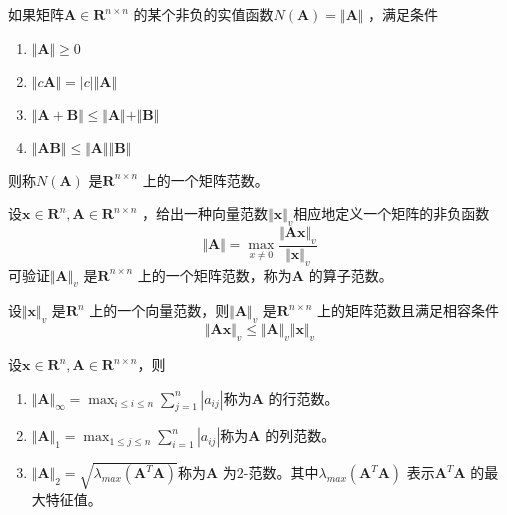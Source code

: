 \documentclass[a4paper]{article}
\begin{document}
\begin{definition}
	如果矩阵$\mathbf{A} \in \mathbf{R}^{n \times n}$ 的某个非负的实值函数$N(\mathbf{A}) = \Vert \mathbf{A} \Vert$ ，满足条件
	\begin{enumerate}
		\item $\Vert \mathbf{A} \Vert \ge 0$ 
		\item $\Vert c \mathbf{A} \Vert = |c| \Vert \mathbf{A} \Vert$ 
		\item $\Vert \mathbf{A} + \mathbf{B} \Vert \le \Vert \mathbf{A} \Vert + \Vert \mathbf{B} \Vert$
		\item $\Vert \mathbf{AB} \Vert \le \Vert \mathbf{A} \Vert \Vert \mathbf{B} \Vert$
	\end{enumerate}
	则称$N(\mathbf{A})$ 是$\mathbf{R}^{n \times n}$ 上的一个矩阵范数。
\end{definition}

\begin{definition}
	设$\mathbf{x} \in \mathbf{R}^{n}, \mathbf{A} \in \mathbf{R}^{n \times n}$ ，给出一种向量范数$\Vert \mathbf{x} \Vert_v$相应地定义一个矩阵的非负函数
	\[
		\Vert \mathbf{A} \Vert = \max_{x \neq 0} \frac{\Vert \mathbf{Ax} \Vert_v}{\Vert \mathbf{x} \Vert_v}
	\] 
	可验证$\Vert \mathbf{A} \Vert_v$ 是$\mathbf{R}^{n \times n}$ 上的一个矩阵范数，称为$\mathbf{A}$ 的算子范数。
\end{definition}

\begin{theorem}
设$\Vert \mathbf{x} \Vert_v$ 是$\mathbf{R}^{n}$ 上的一个向量范数，则$\Vert \mathbf{A} \Vert_v$ 是$\mathbf{R}^{n \times n}$ 上的矩阵范数且满足相容条件
\[
\Vert \mathbf{Ax} \Vert_v \le \Vert \mathbf{A} \Vert_v \Vert \mathbf{x} \Vert_v
\] 
\end{theorem}

\begin{theorem}
	设$\mathbf{x} \in \mathbf{R}^{n}, \mathbf{A} \in \mathbf{R}^{n \times n}$，则
	\begin{enumerate}
		\item $\Vert \mathbf{A} \Vert_\infty = \max_{i \le i \le n} \sum_{j=1}^{n} | a_{ij} |$称为$\mathbf{A}$ 的行范数。
		\item $\Vert \mathbf{A} \Vert_1 = \max_{1 \le j \le n} \sum_{i=1}^{n} |a_{ij}|$称为$\mathbf{A}$ 的列范数。
		\item $\Vert \mathbf{A} \Vert_2 = \sqrt{\lambda_{max} (\mathbf{A}^{T}\mathbf{A})} $称为$\mathbf{A}$ 为$2$-范数。其中$\lambda_{max}(\mathbf{A}^{T}\mathbf{A})$ 表示$\mathbf{A}^{T}\mathbf{A}$ 的最大特征值。
	\end{enumerate}
\end{theorem}
\end{document}
